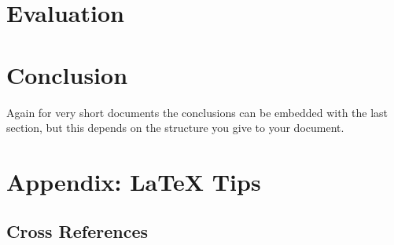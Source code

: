 \documentclass[conference]{IEEEtran}
\begin{document}
\section{Evaluation}

\section{Conclusion}

Again for very short documents the conclusions can be embedded with the last section, but this depends on the structure you give to your document. 




\section{Appendix: \LaTeX\xspace Tips}

\subsection{Cross References}
\label{sec:cross-ref}

\end{document}
